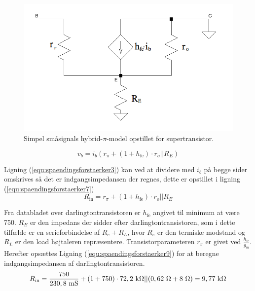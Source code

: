 \begin{figure}[h]
\centering
\includegraphics[scale=0.3]{teknisk/effektforstaerker/hybridpimodel.png}
\caption{Simpel småsignals hybrid-$\pi$-model  opstillet for supertransistor.}
\label{hybridpimodel_darlington}
\end{figure}
\begin{equation}
\label{equ:spaendingsforstaerker6}
v_b = i_b (r_{\pi} + (1+h_{\mathrm{fe}}) \cdot r_o||R_E) 
\end{equation}

Ligning (\ref{equ:spaendingsforstaerker3}) kan ved at dividere med $i_b$ på begge sider omskrives så det er indgangsimpedansen der regnes, dette er opstillet i ligning (\ref{equ:spaendingsforstaerker7})
\begin{equation}
\label{equ:spaendingsforstaerker7}
R_{\mathrm{in}} = r_{\pi} + (1+h_{\mathrm{fe}}) \cdot r_o||R_E 
\end{equation}

Fra databladet over darlingtontransistoren er $h_{\mathrm{fe}}$ angivet til minimum at være 750.  $R_E$ er den impedans der sidder efter darlingtontransistoren, som i dette tilfælde er en serieforbindelse af $R_e + R_L$, hvor $R_e$ er den termiske modstand og $R_L$ er den load højtaleren repræsentere. Transistorparameteren $r_{\pi}$ er givet ved $\frac{h_{\mathrm{fe}}}{g_m}$. Herefter opsættes Ligning (\ref{equ:spaendingsforstaerker9}) for at beregne indgangsimpedansen af darlingtontransistoren.
\begin{equation}
\label{equ:spaendingsforstaerker9}
R_{\mathrm{in}} = \frac{750}{230,8~\mathrm{mS}} + ( 1 + 750 ) \cdot 72,2~\mathrm{k}\ohm || (0,62~\ohm + 8~\ohm) = 9,77~\mathrm{k}\ohm  
\end{equation}

